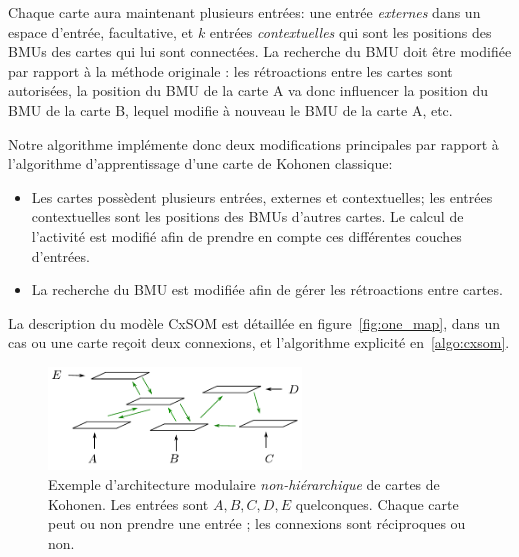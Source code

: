 Chaque carte aura maintenant plusieurs entrées: une entrée \emph{externes} dans un espace d'entrée, facultative, et $k$ entrées \emph{contextuelles} qui sont les positions des BMUs des cartes qui lui sont connectées. 
La recherche du BMU doit être modifiée par rapport à la méthode originale : les rétroactions entre les cartes sont autorisées, la position du BMU de la carte A va donc influencer la position du BMU de la carte B, lequel modifie à nouveau le BMU de la carte A, etc. 


Notre algorithme implémente donc deux modifications principales par rapport à l'algorithme d'apprentissage d'une carte de Kohonen classique: 
\begin{itemize}
\item Les cartes possèdent plusieurs entrées, externes et contextuelles; les entrées contextuelles sont les positions des BMUs d'autres cartes. Le calcul de l'activité est modifié afin de prendre en compte ces différentes couches d'entrées.
\item La recherche du BMU est modifiée afin de gérer les rétroactions entre cartes.
\end{itemize}

La description du modèle CxSOM est détaillée en figure~\ref{fig:one_map}, dans un cas ou une carte reçoit deux connexions, et l'algorithme explicité en~\ref{algo:cxsom}.

\begin{figure}
\centering
\includegraphics[width=0.6\textwidth]{architecture.pdf}
\caption{Exemple d'architecture modulaire \emph{non-hiérarchique} de cartes de Kohonen. Les entrées sont $A,B,C,D,E$ quelconques. Chaque carte peut ou non prendre une entrée ; les connexions sont réciproques ou non.}
\label{fig:archi_non_hierarchique}
\end{figure}

